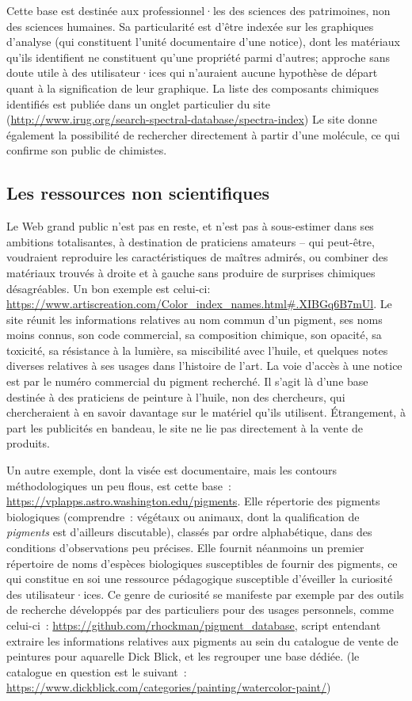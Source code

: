 \documentclass[a4paper,12pt, twoside]{book}
\begin{document}
Cette base est destinée aux professionnel·les des sciences des patrimoines, non des sciences humaines. Sa particularité est d’être indexée sur les graphiques d’analyse (qui constituent l’unité documentaire d’une notice), dont les matériaux qu’ils identifient ne constituent qu’une propriété parmi d’autres; approche sans doute utile à des utilisateur·ices qui n’auraient aucune hypothèse de départ quant à la signification de leur graphique. La liste des composants chimiques identifiés est publiée dans un onglet particulier du site (\url{http://www.irug.org/search-spectral-database/spectra-index}) Le site donne également la possibilité de rechercher directement à partir d’une molécule, ce qui confirme son public de chimistes.

\subsection*{Les ressources non scientifiques}

Le Web grand public n’est pas en reste, et n’est pas à sous-estimer dans ses ambitions totalisantes, à destination de praticiens amateurs – qui peut-être, voudraient reproduire les caractéristiques de maîtres admirés, ou combiner des matériaux trouvés à droite et à gauche sans produire de surprises chimiques désagréables. Un bon exemple est celui-ci: \url{https://www.artiscreation.com/Color_index_names.html#.XIBGq6B7mUl}. Le site réunit les informations relatives au nom commun d’un pigment, ses noms moins connus, son code commercial, sa composition chimique, son opacité, sa toxicité, sa résistance à la lumière, sa miscibilité avec l’huile, et quelques notes diverses relatives à ses usages dans l’histoire de l’art. La voie d’accès à une notice est par le numéro commercial du pigment recherché. Il s’agit là d’une base destinée à des praticiens de peinture à l’huile, non des chercheurs, qui chercheraient à en savoir davantage sur le matériel qu’ils utilisent. Étrangement, à part les publicités en bandeau, le site ne lie pas directement à la vente de produits.

Un autre exemple, dont la visée est documentaire, mais les contours méthodologiques un peu flous, est cette base~: \url{https://vplapps.astro.washington.edu/pigments}. Elle répertorie des pigments biologiques (comprendre~: végétaux ou animaux, dont la qualification de \textit{pigments} est d’ailleurs discutable), classés par ordre alphabétique, dans des conditions d’observations peu précises. Elle fournit néanmoins un premier répertoire de noms d’espèces biologiques susceptibles de fournir des pigments, ce qui constitue en soi une ressource pédagogique susceptible d’éveiller la curiosité des utilisateur·ices. Ce genre de curiosité se manifeste par exemple par des outils de recherche développés par des particuliers pour des usages personnels, comme celui-ci~: \url{https://github.com/rhockman/pigment_database}, script entendant extraire les informations relatives aux pigments au sein du catalogue de vente de peintures pour aquarelle Dick Blick, et les regrouper une base dédiée. (le catalogue en question est le suivant~: \url{https://www.dickblick.com/categories/painting/watercolor-paint/})
\end{document}
